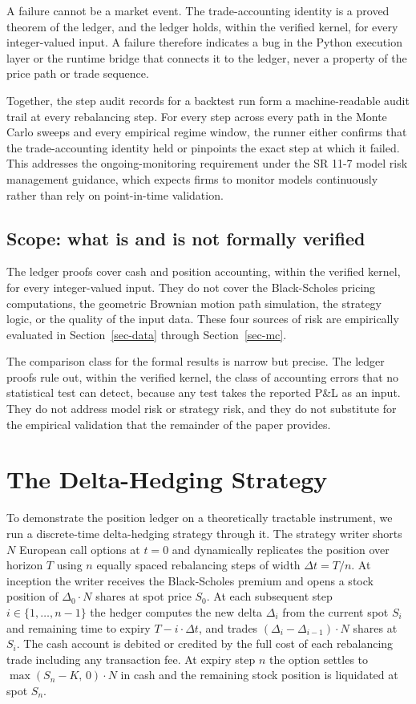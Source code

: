 \documentclass[
  11pt,
  letterpaper,
  DIV=12,
  numbers=noendperiod]{scrartcl}
\numberwithin{equation}{section}
\numberwithin{figure}{section}
\numberwithin{table}{section}
\let\quantproofsoldsection\section
\renewcommand{\section}{\clearpage\quantproofsoldsection}
\begin{document}
A failure cannot be a market event. The trade-accounting identity is a
proved theorem of the ledger, and the ledger holds, within the verified
kernel, for every integer-valued input. A failure therefore indicates a
bug in the Python execution layer or the runtime bridge that connects it
to the ledger, never a property of the price path or trade sequence.

Together, the step audit records for a backtest run form a
machine-readable audit trail at every rebalancing step. For every step
across every path in the Monte Carlo sweeps and every empirical regime
window, the runner either confirms that the trade-accounting identity
held or pinpoints the exact step at which it failed. This addresses the
ongoing-monitoring requirement under the SR 11-7 model risk management
guidance, which expects firms to monitor models continuously rather than
rely on point-in-time validation.

\subsection{Scope: what is and is not formally
verified}\label{sec-ledger-scope}

The ledger proofs cover cash and position accounting, within the
verified kernel, for every integer-valued input. They do not cover the
Black-Scholes pricing computations, the geometric Brownian motion path
simulation, the strategy logic, or the quality of the input data. These
four sources of risk are empirically evaluated in Section~\ref{sec-data}
through Section~\ref{sec-mc}.

The comparison class for the formal results is narrow but precise. The
ledger proofs rule out, within the verified kernel, the class of
accounting errors that no statistical test can detect, because any test
takes the reported P\&L as an input. They do not address model risk or
strategy risk, and they do not substitute for the empirical validation
that the remainder of the paper provides.

\section{The Delta-Hedging Strategy}\label{sec-strategy}

To demonstrate the position ledger on a theoretically tractable
instrument, we run a discrete-time delta-hedging strategy through it.
The strategy writer shorts \(N\) European call options at \(t = 0\) and
dynamically replicates the position over horizon \(T\) using \(n\)
equally spaced rebalancing steps of width \(\Delta t = T/n\). At
inception the writer receives the Black-Scholes premium and opens a
stock position of \(\Delta_0 \cdot N\) shares at spot price \(S_0\). At
each subsequent step \(i \in \{1, \dots, n-1\}\) the hedger computes the
new delta \(\Delta_i\) from the current spot \(S_i\) and remaining time
to expiry \(T - i \cdot \Delta t\), and trades
\((\Delta_i - \Delta_{i-1}) \cdot N\) shares at \(S_i\). The cash
account is debited or credited by the full cost of each rebalancing
trade including any transaction fee. At expiry step \(n\) the option
settles to \(\max(S_n - K,\, 0) \cdot N\) in cash and the remaining
stock position is liquidated at spot \(S_n\).
\end{document}
